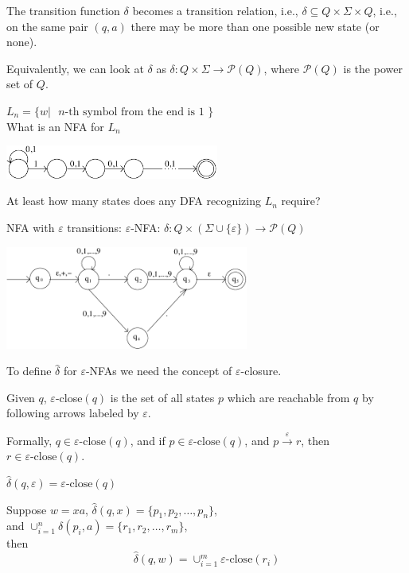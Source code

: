 \begin{frame}

The transition function $\delta$ becomes a transition relation,
i.e., $\delta\subseteq Q\times\Sigma\times Q$, i.e., on the
same pair $(q,a)$ there may be more than one possible new state (or
none).

Equivalently, we can look at $\delta$ as
$\delta:Q\times\Sigma\longrightarrow\mathcal{P}(Q)$, where
$\mathcal{P}(Q)$ is the power set of $Q$.

$L_n=\{w|\text{ $n$-th symbol from the end is 1 }\}$ \\
What is an NFA for $L_n$
\begin{center}
\includegraphics[width=7cm]{figures/2.pdf}
\end{center}
At least how many states does any DFA recognizing $L_n$ require?
\end{frame}

\begin{frame}
NFA with $\varepsilon$ transitions: $\varepsilon$-NFA:
$\delta:Q\times(\Sigma\cup\{\varepsilon\})\longrightarrow\mathcal{P}(Q)$

\begin{center}
\includegraphics[width=8cm]{figures/3.pdf}
\end{center}
\end{frame}

\begin{frame}
To define $\hat\delta$ for $\varepsilon$-NFAs we need the concept of
$\varepsilon$-closure.

Given $q$, $\varepsilon$-close$(q)$ is the set of all states $p$ which
are reachable from $q$ by following arrows labeled by $\varepsilon$.

Formally, $q\in\varepsilon\text{-close}(q)$, and if
$p\in\varepsilon\text{-close}(q)$, and
$p\stackrel{\varepsilon}{\longrightarrow}r$, then
$r\in\varepsilon\text{-close}(q)$.

$\hat\delta(q,\varepsilon)=\varepsilon\text{-close}(q)$

Suppose $w=xa$, $\hat\delta(q,x)=\{p_1,p_2,\ldots,p_n\}$, \\
and $\cup_{i=1}^n\delta(p_i,a)=\{r_1,r_2,\ldots,r_m\}$, \\
then
$$
\hat\delta(q,w)=\cup_{i=1}^m\varepsilon\text{-close}(r_i)
$$
\end{frame}


